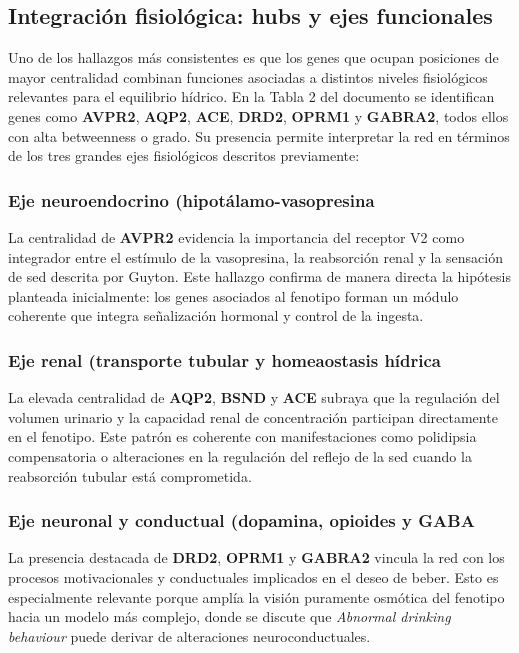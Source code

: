 \subsection{Integración fisiológica: hubs y ejes funcionales}
Uno de los hallazgos más consistentes es que los genes que ocupan posiciones de mayor centralidad combinan funciones asociadas a distintos niveles fisiológicos relevantes para el equilibrio hídrico. En la Tabla 2 del documento se identifican genes como \textbf{AVPR2}, \textbf{AQP2}, \textbf{ACE}, \textbf{DRD2}, \textbf{OPRM1} y \textbf{GABRA2}, todos ellos con alta betweenness o grado. Su presencia permite interpretar la red en términos de los tres grandes ejes fisiológicos descritos previamente:

\subsubsection{Eje neuroendocrino (hipotálamo-vasopresina}
La centralidad de \textbf{AVPR2} evidencia la importancia del receptor V2 como integrador entre el estímulo de la vasopresina, la reabsorción renal y la sensación de sed descrita por Guyton. Este hallazgo confirma de manera directa la hipótesis planteada inicialmente: los genes asociados al fenotipo forman un módulo coherente que integra señalización hormonal y control de la ingesta.

\subsubsection{Eje renal (transporte tubular y homeaostasis hídrica}
La elevada centralidad de \textbf{AQP2}, \textbf{BSND} y \textbf{ACE} subraya que la regulación del volumen urinario y la capacidad renal de concentración participan directamente en el fenotipo. Este patrón es coherente con manifestaciones como polidipsia compensatoria o alteraciones en la regulación del reflejo de la sed cuando la reabsorción tubular está comprometida.

\subsubsection{Eje neuronal y conductual (dopamina, opioides y GABA}
La presencia destacada de \textbf{DRD2}, \textbf{OPRM1} y \textbf{GABRA2} vincula la red con los procesos motivacionales y conductuales implicados en el deseo de beber. Esto es especialmente relevante porque amplía la visión puramente osmótica del fenotipo hacia un modelo más complejo, donde se discute que \textit{Abnormal drinking behaviour} puede derivar de alteraciones neuroconductuales.

